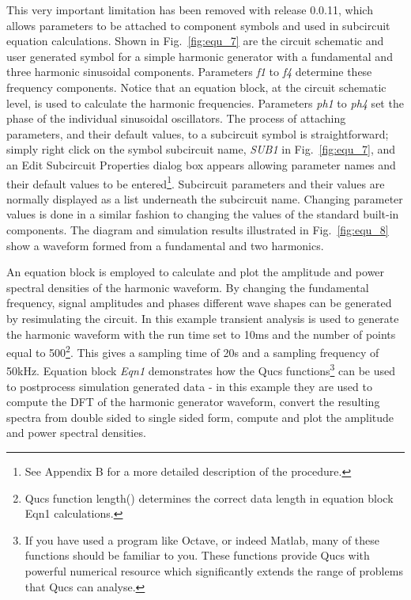 \vspace{3mm}
This very important limitation has been removed with release 0.0.11,
which allows parameters to be attached to component symbols and used
in subcircuit equation calculations.  Shown in Fig.~\ref{fig:equ_7}
are the circuit schematic and user generated symbol for a simple
harmonic generator with a fundamental and three harmonic sinusoidal
components. Parameters \textit{f1} to \textit{f4} determine these
frequency components. Notice that an equation block, at the circuit
schematic level, is used to calculate the harmonic
frequencies. Parameters \textit{ph1} to \textit{ph4} set the phase of
the individual sinusoidal oscillators. The process of attaching
parameters, and their default values, to a subcircuit symbol is
straightforward; simply right click on the symbol subcircuit name,
\textit{SUB1} in Fig.~\ref{fig:equ_7}, and an Edit Subcircuit
Properties dialog box appears allowing parameter names and their
default values to be entered\footnote{See Appendix B for a more
detailed description of the procedure.}. Subcircuit parameters and
their values are normally displayed as a list underneath the
subcircuit name.  Changing parameter values is done in a similar
fashion to changing the values of the standard built-in
components. The diagram and simulation results illustrated in
Fig.~\ref{fig:equ_8} show a waveform formed from a fundamental and two
harmonics.

\vspace{3mm}
An equation block is employed to calculate and plot the amplitude and
power spectral densities of the harmonic waveform. By changing the
fundamental frequency, signal amplitudes and phases different wave
shapes can be generated by resimulating the circuit. In this example
transient analysis is used to generate the harmonic waveform with the
run time set to 10ms and the number of points equal to
500\footnote{Qucs function length() determines the correct data length
in equation block Eqn1 calculations.}. This gives a sampling time of
20\micro s and a sampling frequency of 50kHz. Equation block
\textit{Eqn1} demonstrates how the Qucs functions\footnote{If you have
used a program like Octave, or indeed Matlab, many of these functions
should be familiar to you. These functions provide Qucs with powerful
numerical resource which significantly extends the range of problems
that Qucs can analyse.} can be used to postprocess simulation
generated data - in this example they are used to compute the DFT of
the harmonic generator waveform, convert the resulting spectra from
double sided to single sided form, compute and plot the amplitude and
power spectral densities.

